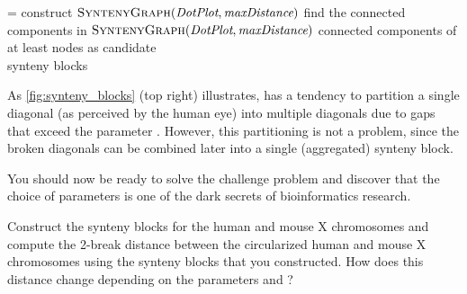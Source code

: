 \begin{elaboration}
\begin{algorithmic}
\leftskip = \algindent %
	\State construct $\text{\scshape SyntenyGraph}(\textit{DotPlot}, \textit{maxDistance})$
	\State find the connected components in $\text{\scshape SyntenyGraph}(\textit{DotPlot}, \textit{maxDistance})$
	\State \output connected components of at least  nodes as candidate\\ \hspace{4.7em}synteny blocks
\EndAlgorithm
\end{algorithmic}
\end{elaboration}

\fudgespace

\noindent As \autoref{fig:synteny_blocks} (top right) illustrates,  has a tendency to partition a single diagonal (as perceived by the human eye) into multiple diagonals due to gaps that exceed the parameter . However, this partitioning is not a problem, since the broken diagonals can be combined later into a single (aggregated) synteny block. \par

\vspace{\baselineskip}

\begin{qbox}\end{qbox}

\noindent You should now be ready to solve the challenge problem and discover that the choice of parameters is one of the dark secrets of bioinformatics research.\\

\begin{finalchallenge}{
Construct the synteny blocks for the human and mouse X chromosomes and compute the 2-break distance between the circularized human and mouse X chromosomes using the synteny blocks that you constructed. How does this distance change depending on the parameters  and ?
}\end{finalchallenge}

